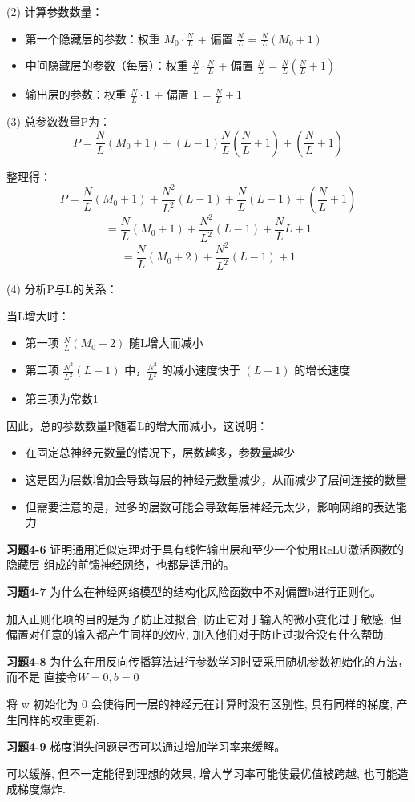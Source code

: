 (2) 计算参数数量：
\begin{itemize}
    \item 第一个隐藏层的参数：权重 $M_0 \cdot \frac{N}{L}$ + 偏置 $\frac{N}{L}$ = $\frac{N}{L}(M_0 + 1)$
    \item 中间隐藏层的参数（每层）：权重 $\frac{N}{L} \cdot \frac{N}{L}$ + 偏置 $\frac{N}{L}$ = $\frac{N}{L}(\frac{N}{L} + 1)$
    \item 输出层的参数：权重 $\frac{N}{L} \cdot 1$ + 偏置 1 = $\frac{N}{L} + 1$
\end{itemize}

(3) 总参数数量P为：
\[
P = \frac{N}{L}(M_0 + 1) + (L-1)\frac{N}{L}(\frac{N}{L} + 1) + (\frac{N}{L} + 1)
\]

整理得：
\[
P = \frac{N}{L}(M_0 + 1) + \frac{N^2}{L^2}(L-1) + \frac{N}{L}(L-1) + (\frac{N}{L} + 1)
\]
\[
= \frac{N}{L}(M_0 + 1) + \frac{N^2}{L^2}(L-1) + \frac{N}{L}L + 1
\]
\[
= \frac{N}{L}(M_0 + 2) + \frac{N^2}{L^2}(L-1) + 1
\]

(4) 分析P与L的关系：

当L增大时：
\begin{itemize}
    \item 第一项 $\frac{N}{L}(M_0 + 2)$ 随L增大而减小
    \item 第二项 $\frac{N^2}{L^2}(L-1)$ 中，$\frac{N^2}{L^2}$ 的减小速度快于 $(L-1)$ 的增长速度
    \item 第三项为常数1
\end{itemize}

因此，总的参数数量P随着L的增大而减小，这说明：
\begin{itemize}
    \item 在固定总神经元数量的情况下，层数越多，参数量越少
    \item 这是因为层数增加会导致每层的神经元数量减少，从而减少了层间连接的数量
    \item 但需要注意的是，过多的层数可能会导致每层神经元太少，影响网络的表达能力
\end{itemize}

\noindent\textbf{习题4-6} 证明通用近似定理对于具有线性输出层和至少一个使用ReLU激活函数的隐藏层
组成的前馈神经网络，也都是适用的。



\noindent\textbf{习题4-7} 为什么在神经网络模型的结构化风险函数中不对偏置b进行正则化。

加入正则化项的目的是为了防止过拟合, 防止它对于输入的微小变化过于敏感, 但偏置对任意的输入都产生同样的效应, 加入他们对于防止过拟合没有什么帮助.

\noindent\textbf{习题4-8} 为什么在用反向传播算法进行参数学习时要采用随机参数初始化的方法，而不是
直接令$W=0,b=0$

将 w​ 初始化为 0 会使得同一层的神经元在计算时没有区别性, 具有同样的梯度, 产生同样的权重更新.

\noindent\textbf{习题4-9} 梯度消失问题是否可以通过增加学习率来缓解。

可以缓解, 但不一定能得到理想的效果, 增大学习率可能使最优值被跨越, 也可能造成梯度爆炸.

